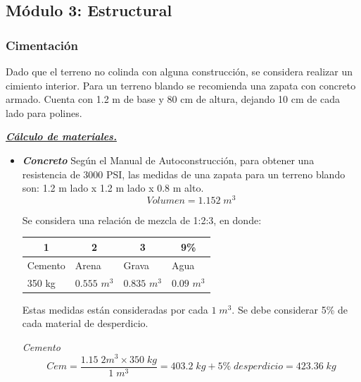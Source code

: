 \newpage
\subsection{Módulo 3: Estructural}

\subsubsection{Cimentación}
Dado que el terreno no colinda con alguna construcción, se considera realizar un cimiento interior. Para un terreno blando se recomienda una zapata con concreto armado. Cuenta con 1.2 m de base y 80 cm de altura, dejando 10 cm de cada lado para polines.

\textbf{\textit{\underline{Cálculo de materiales.}}}

\begin{itemize}
	\item \textbf{\textit{Concreto}} 
	\newline
	Según el Manual de Autoconstrucción\cite{CEMEX}, para obtener una resistencia de 3000 PSI, las medidas de una zapata para un terreno blando son: 1.2 m lado x 1.2 m lado x 0.8 m alto.
	\begin{equation}\label{eq:ec1}
		Volumen = 1.152\;  m^{3}
	\end{equation}
	
	Se considera una relación de mezcla de 1:2:3, en donde: 
	
	\begin{table}[H]
		\centering
		\begin{tabular}{|p{4.215em}|p{4.145em}|p{4.285em}|p{4.07em}|}
			\hline
			\multicolumn{1}{|c|}{\textbf{1}} & \multicolumn{1}{c|}{\textbf{2}} & \multicolumn{1}{c|}{\textbf{3}} & \multicolumn{1}{c|}{\textbf{9\%}} \\
			\hline \hline
			Cemento & Arena & Grava & Agua \\
			\hline
			350 kg & $ 0.555 $ $ m^3 $ & $ 0.835 $ $ m^3 $ & $ 0.09 $ $ m^3 $ \\
			\hline
		\end{tabular}%
	\end{table}%
	
	Estas medidas están consideradas por cada $1 \; m^{3}$. Se debe considerar 5\% de cada material de desperdicio.
	
	\textit{Cemento}
	\begin{equation}\label{eq:ec1}
		Cem = \frac{{1.15\;2 m^{3}} \times {350\; kg}}{1\;  m^{3}} = 403.2\; kg + 5\% \;desperdicio = 423.36\; kg  
	\end{equation}


\end{itemize}
